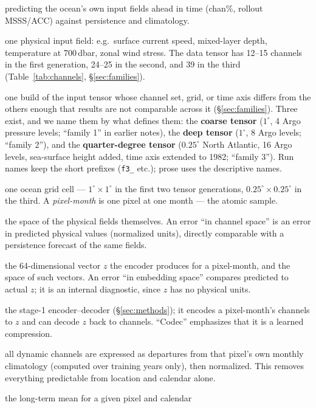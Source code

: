 \documentclass[10pt]{article}
\begin{document}
\begin{description}
  predicting the ocean's own input fields ahead in time (chan\%, rollout
  MSSS/ACC) against persistence and climatology.
\item[Channel] one physical input field: e.g.\ surface current speed,
  mixed-layer depth, temperature at 700\,dbar, zonal wind stress. The
  data tensor has 12--15 channels in the first generation, 24--25 in the
  second, and 39 in the third (Table~\ref{tab:channels},
  \S\ref{sec:families}).
\item[Tensor generation] one build of the input tensor whose channel
  set, grid, or time axis differs from the others enough that results
  are not comparable across it (\S\ref{sec:families}). Three exist, and
  we name them by what defines them: the \textbf{coarse tensor}
  ($1^\circ$, 4 Argo pressure levels; ``family 1'' in earlier notes),
  the \textbf{deep tensor} ($1^\circ$, 8 Argo levels; ``family 2''),
  and the \textbf{quarter-degree tensor} ($0.25^\circ$ North Atlantic,
  16 Argo levels, sea-surface height added, time axis extended to 1982;
  ``family 3''). Run names keep the short prefixes (\texttt{f3\_} etc.);
  prose uses the descriptive names.
\item[Pixel] one ocean grid cell --- $1^\circ\times1^\circ$ in the first
  two tensor generations, $0.25^\circ\times0.25^\circ$ in the third. A
  \emph{pixel-month} is one pixel at one month --- the atomic sample.
\item[Channel space] the space of the physical fields themselves. An
  error ``in channel space'' is an error in predicted physical values
  (normalized units), directly comparable with a persistence forecast
  of the same fields.
\item[Embedding / embedding space] the 64-dimensional vector $z$ the
  encoder produces for a pixel-month, and the space of such vectors. An
  error ``in embedding space'' compares predicted to actual $z$; it is
  an internal diagnostic, since $z$ has no physical units.
\item[Codec] the stage-1 encoder--decoder (\S\ref{sec:methods}); it
  encodes a pixel-month's channels to $z$ and can decode $z$ back to
  channels. ``Codec'' emphasizes that it is a learned compression.
\item[Anomaly space] all dynamic channels are expressed as departures
  from that pixel's own monthly climatology (computed over training
  years only), then normalized. This removes everything predictable
  from location and calendar alone.
\item[Climatology] the long-term mean for a given pixel and calendar

\end{description}
\end{document}

